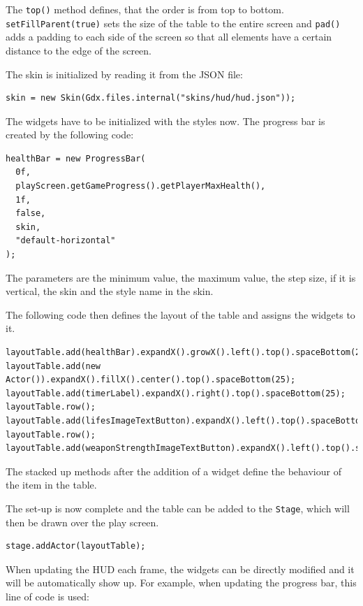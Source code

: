 \documentclass[12p]{article}
\begin{document}
The \texttt{top()} method defines, that the order is from top to bottom. \texttt{setFillParent(true)} sets the size of the table to the entire screen and \texttt{pad()} adds a padding to each side of the screen so that all elements have a certain distance to the edge of the screen.

The skin is initialized by reading it from the JSON file:

\begin{verbatim}
skin = new Skin(Gdx.files.internal("skins/hud/hud.json"));
\end{verbatim}

The widgets have to be initialized with the styles now. The progress bar is created by the following code:

\begin{verbatim}
healthBar = new ProgressBar(
  0f,
  playScreen.getGameProgress().getPlayerMaxHealth(),
  1f,
  false,
  skin,
  "default-horizontal"
);
\end{verbatim}

The parameters are the minimum value, the maximum value, the step size, if it is vertical, the skin and the style name in the skin.

The following code then defines the layout of the table and assigns the widgets to it.

\begin{verbatim}
layoutTable.add(healthBar).expandX().growX().left().top().spaceBottom(25);
layoutTable.add(new Actor()).expandX().fillX().center().top().spaceBottom(25);
layoutTable.add(timerLabel).expandX().right().top().spaceBottom(25);
layoutTable.row();
layoutTable.add(lifesImageTextButton).expandX().left().top().spaceBottom(10);
layoutTable.row();
layoutTable.add(weaponStrengthImageTextButton).expandX().left().top().spaceBottom(10);
\end{verbatim}

The stacked up methods after the addition of a widget define the behaviour of the item in the table.

The set-up is now complete and the table can be added to the \texttt{Stage}, which will then be drawn over the play screen.

\begin{verbatim}
stage.addActor(layoutTable);
\end{verbatim}

When updating the HUD each frame, the widgets can be directly modified and it will be automatically show up. For example, when updating the progress bar, this line of code is used:
\end{document}
